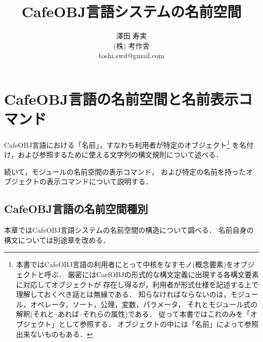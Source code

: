 \documentclass[a4paper,oneside,10pt]{memoir}
\begin{document}
\tightlists
\sloppy
\raggedbottom
{}
\frontmatter
\pagestyle{empty}
\title{\textbf{CafeOBJ言語システムの名前空間}}
\author{澤田 寿実\\
  (株) 考作舎\\
  toshi.swd@gmail.com}
\date{}
\maketitle
 
\thispagestyle{empty}
\newpage
\mainmatter
\pagestyle{plain}
\tableofcontents
\newpage
\chapter{CafeOBJ言語の名前空間と名前表示コマンド}
\label{chap:name-space}
CafeOBJ言語における「名前」，すなわち利用者が特定のオブジェクト\footnote{
本書ではCafeOBJ言語の利用者にとって中核をなすモノ(概念要素)をオブジェクトと呼ぶ．
厳密にはCaefOBJの形式的な構文定義に出現する各構文要素に対応してオブジェクトが%
存在し得るが，利用者が形式仕様を記述する上で理解しておくべき話とは無縁である．
知らなければならないのは，モジュール，オペレータ，ソート，公理，変数，パラメータ，%
それとモジュール式の解釈(それと--あれば--それらの属性)である．
従って本書ではこれのみを「オブジェクト」として参照する．
オブジェクトの中には「名前」によって参照出来ないものもある．}
を名付け，および参照するために使える文字列の構文規則について述べる．

続いて，モジュールの名前空間の表示コマンド，
および特定の名前を持ったオブジェクトの表示コマンドについて説明する．

\section{CafeOBJ言語の名前空間種別}
\label{sec:cafeobj-name-spaces}
本章ではCafeOBJ言語システムの名前空間の構造について調べる．
名前自身の構文については別途章を改める．
\end{document}
